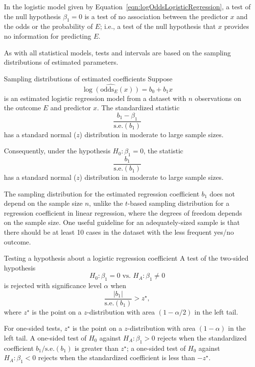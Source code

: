 In the logistic model given by Equation~\ref{eqn:logOddsLogisticRegression}, a test of the null hypothesis $\beta_1 = 0$ is a test of no association between the predictor $x$ and the odds or the probability of $E$; i.e., a test of the null hypothesis that $x$ provides no information for predicting $E$.

As with all statistical models, tests and intervals are based on the sampling distributions of estimated parameters.


\begin{onebox}{Sampling distributions of estimated coefficients}
Suppose
\[
  \widehat{\log(\textrm{odds}_{E}(x))} = b_0 + b_1 x
\]
is an estimated logistic regression model from a dataset with $n$ observations on the outcome $E$ and predictor $x$.  The standardized statistic
\[
      \frac{b_1 - \beta_1}{\textrm{s.e.}(b_1)}
\]
has a standard normal ($z$) distribution in moderate to large sample sizes.

Consequently, under the hypothesis $H_0: \beta_1 = 0$, the statistic
\[
      \frac{b_1}{\textrm{s.e.}(b_1)}
\]
has a standard normal ($z$) distribution in moderate to large sample sizes.
\end{onebox}

The sampling distribution for the estimated regression coefficient $b_1$ does not depend on the sample size $n$, unlike the $t$-based sampling distribution for a regression coefficient in linear regression, where the degrees of freedom depends on the sample size.  One useful guideline for an adequately-sized sample is that there should be at least 10 cases in the dataset with the less frequent yes/no outcome.


\begin{onebox}{Testing a hypothesis about a logistic regression coefficient}
A test of the two-sided hypothesis
\[
  H_0: \beta_1 = 0 \text{ vs. } H_A: \beta_1 \ne 0
\]
is rejected with significance level $\alpha$ when
\[
     \frac{|b_1|}{\textrm{s.e.}(b_1)} > z^\star,
\]
where $z^\star$ is the point on a $z$-distribution with area $(1 - \alpha/2)$ in the left tail.
\end{onebox}

For one-sided tests, $z^\star$ is the point on a $z$-distribution with area $(1 - \alpha)$ in the left tail. A one-sided test of $H_0$ against $H_A: \beta_1 > 0$ rejects when the standardized coefficient $b_1/\textrm{s.e.}(b_1)$ is greater than  $ z^\star$; a one-sided test of $H_0$ against $H_A: \beta_1 < 0$  rejects when the standardized coefficient is less than $-z^\star$.

